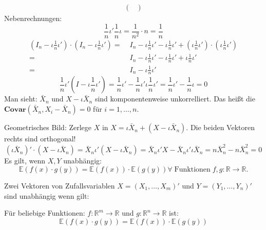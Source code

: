 \documentclass[10pt]{article}
\newcommand{\IR}{\mathbb{R}} %
\newcommand{\EW}{\mathbb{E}} %
\newenvironment{BSP}[1][]
{\begin{Beispiel}[frametitle=#1]}{\end{Beispiel}}
\begin{document}
\begin{BSP}[Beispiel 3.0.1 (komponentenweise Unkorreliertheit)]
\begin{equation*}
\begin{split}
\begin{pmatrix}
						\end{pmatrix}
					\end{split}
				\end{equation*}
				Nebenrechnungen:
				\begin{equation*}
					\frac{1}{n} \iota' \frac{1}{n} \iota = \frac{1}{n^2} \cdot n = \frac{1}{n} 
				\end{equation*}
				\begin{equation*}
					\begin{split}
						\left(I_n - \iota \frac{1}{n} \iota '\right) \cdot \left(I_n - \iota \frac{1}{n} \iota '\right) =& \; I_n - \iota \frac{1}{n} \iota' - \iota \frac{1}{n} \iota' + \left(\iota \frac{1}{n} \iota' \right) \cdot \left( \iota \frac{1}{n} \iota'\right)\\
						=& \;  I_n - \iota \frac{1}{n} \iota' - \iota \frac{1}{n} \iota' + \iota \frac{1}{n} \iota' \\
						=&\;  I_n - \iota \frac{1}{n} \iota'
					\end{split}
				\end{equation*}
				\begin{equation*}
					\frac{1}{n} \iota' (I-\iota \frac{1}{n} \iota') = \frac{1}{n} \iota' - \frac{1}{n} \iota'\iota \frac{1}{n} \iota' = \frac{1}{n} \iota' - \frac{1}{n} \iota = 0
				\end{equation*}
				Man sieht: $\bar{X}_n$ und $X - \iota \bar{X}_n$ sind komponentenweise unkorrelliert. Das heißt die $\textbf{Covar}(\bar{X}_n, X_i - \bar{X}_n) =0$ für $i = 1, \ldots, n$. 
				
				Geometrisches Bild: Zerlege $X$ in $X = \iota \bar{X}_n + (X - \iota \bar{X}_n)$. Die beiden Vektoren rechts sind orthogonal!
				\begin{equation*}
					(\iota \bar{X}_n)' \cdot (X-\iota \bar{X}_n) = \bar{X}_n\iota' (X-\iota\bar{X}_n) = \bar{X}_n \iota' X - \bar{X}_n \iota'\iota\bar{X}_n = n \bar{X}_n^2 - n \bar{X}_n^2 =0
				\end{equation*}
				Es gilt, wenn $X,Y$ unabhängig:
				\begin{equation*}
					\EW(f(x) \cdot g(y)) = \EW(f(x)) \cdot \EW(g(y)) \forall \; \text{Funktionen} \; f,g: \IR \rightarrow \IR.
				\end{equation*}
			\end{BSP}
			\begin{Definition}
				Zwei Vektoren von Zufallsvariablen $X = (X_1, \ldots, X_m)'$ und $Y=(Y_1, \ldots, Y_n)'$ sind unabhängig wenn gilt:
				
				Für beliebige Funktionen: $f: \IR^m \rightarrow \IR$ und $g: \IR^n \rightarrow \IR$ ist:
				\begin{equation*}
					\EW(f(x) \cdot g(y)) = \EW(f(x)) \cdot \EW(g(y))
				\end{equation*}
			\end{Definition}
\end{document}
